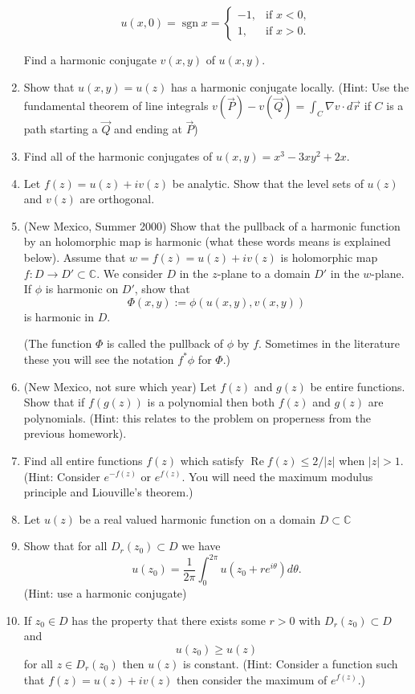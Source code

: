\documentclass[a4paper,10pt]{article}
\newcommand{\CC}{\mathbb{C}}
\renewcommand{\Re}{\operatorname{Re}}
\begin{document}
\begin{enumerate}
	\[u(x,0)=\operatorname{sgn} x=\begin{cases} -1, & \text{if } x<0, \\ 1, & \text{if } x>0. \end{cases}\]
	
	Find a harmonic conjugate $v(x,y)$ of $u(x,y)$.
	
	\item  Show that $u(x,y) = u(z)$ has a harmonic conjugate locally. (Hint: Use the fundamental theorem of line integrals $v(\vec{P}) -v(\vec{Q})  = \int_{C} \nabla v \cdot d\vec{r}$ if $C$ is a path starting a $\vec{Q}$ and ending at $\vec{P}$)

	\item 
	Find all of the harmonic conjugates of $u(x,y) = x^3 - 3xy^2 + 2x$. 
	
	\item Let $f(z) = u(z) + i v(z)$ be analytic. 
	Show that the level sets of $u(z)$ and $v(z)$ are orthogonal.
	
	\item (New Mexico, Summer 2000)
	Show that the pullback of a harmonic function by an holomorphic map is harmonic (what these words means is explained below).
	Assume that $w = f(z) = u(z)+iv(z)$ is holomorphic map $f:D \to D' \subset \CC$. We consider $D$ in the $z$-plane to a domain $D'$ in the $w$-plane. 
	If $\phi$ is harmonic on $D'$, show that 
	$$ \Phi(x,y) := \phi(u(x,y),v(x,y))$$
	is harmonic in $D$. 
	
	(The function $\Phi$ is called the pullback of $\phi$ by $f$. Sometimes in the literature these you will see the notation $f^*\phi$ for $\Phi$.)
		
	\item (New Mexico, not sure which year) 
	Let $f(z)$ and $g(z)$ be entire functions. 
	Show that if $f(g(z))$ is a polynomial then both $f(z)$ and $g(z)$ are polynomials.
	(Hint: this relates to the problem on properness from the previous homework).
	
	\item Find all entire functions $f(z)$ which satisfy $\Re f(z) \leq 2/\vert z \vert$ when $\vert z \vert > 1$. (Hint: Consider $e^{-f(z)}$ or $e^{f(z)}$. You will need the maximum modulus principle and Liouville's theorem.)
	
	\item Let $u(z)$ be a real valued harmonic function on a domain $D \subset \CC$ 


		\item Show that for all $D_r(z_0) \subset D$ we have 
		$$ u(z_0) = \frac{1}{2\pi} \int_0^{2\pi} u(z_0+ r e^{i\theta}) d\theta. $$ (Hint: use a harmonic conjugate)
		\item If $z_0 \in D$ has the property that there exists some $r>0$ with $D_r(z_0) \subset D$ and 
		$$ u(z_0) \geq u(z) $$
		for all $z \in D_r(z_0)$ then $u(z)$ is constant. 
		(Hint: Consider a function such that $f(z) = u(z)+iv(z)$ then consider the maximum of $e^{f(z)}$.)
		

\end{enumerate}
\end{document}
